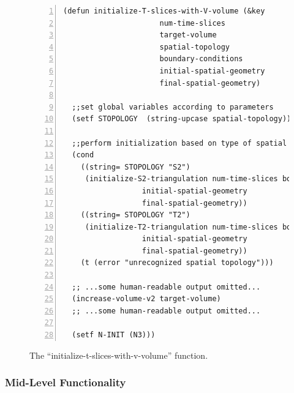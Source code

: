 \message{ !name(programmers_guide.tex)}\documentclass[12pt]{article}
\begin{document}
\begin{figure}[htb]
\begin{small}
\begin{lstlisting}[numbers=left]
(defun initialize-T-slices-with-V-volume (&key 
					  num-time-slices
					  target-volume
					  spatial-topology
					  boundary-conditions
					  initial-spatial-geometry
					  final-spatial-geometry)

  ;;set global variables according to parameters
  (setf STOPOLOGY  (string-upcase spatial-topology))

  ;;perform initialization based on type of spatial topology
  (cond 
    ((string= STOPOLOGY "S2")
     (initialize-S2-triangulation num-time-slices boundary-conditions 
				  initial-spatial-geometry
				  final-spatial-geometry))
    ((string= STOPOLOGY "T2") 
     (initialize-T2-triangulation num-time-slices boundary-conditions
				  initial-spatial-geometry
				  final-spatial-geometry))
    (t (error "unrecognized spatial topology")))
  
  ;; ...some human-readable output omitted... 
  (increase-volume-v2 target-volume)
  ;; ...some human-readable output omitted... 

  (setf N-INIT (N3)))
\end{lstlisting}
\end{small}
\caption{The ``initialize-t-slices-with-v-volume'' function.}
\label{f:itswvv}
\end{figure}

\subsubsection{Mid-Level Functionality}
\label{s:initialization:mid-level-functions}
\end{document}
